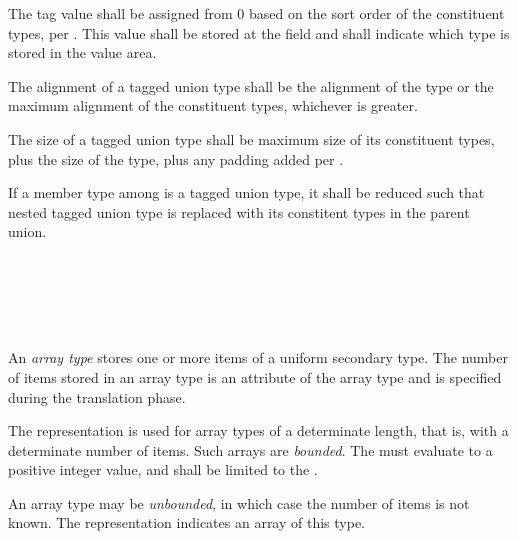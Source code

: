 \specsubsubitem
The tag value shall be assigned from $0$ based on the sort order of the
constituent types, per . This value shall be stored at the
 field and shall indicate which type is stored in the value area.


\specsubsubitem
The alignment of a tagged union type shall be the alignment of the
 type or the maximum alignment of the constituent types, whichever
is greater.

\specsubsubitem
The size of a tagged union type shall be maximum size of its constituent types,
plus the size of the  type, plus any padding added per
.

\specsubsubitem
If a member type among  is a tagged union type, it
shall be reduced such that nested tagged union type is replaced with its
constitent types in the parent union.



\begin{grammar}
 \\
	\terminal{[} \terminal{]}  \\
	\terminal{[}  \terminal{]}  \\
	\terminal{[} \terminal{*} \terminal{]}  \\
\end{grammar}

\specsubsubitem
An \textit{array type} stores one or more items of a uniform secondary type.
The number of items stored in an array type is an attribute of the array type
and is specified during the translation phase.

\specsubsubitem
The  representation is used for array types of a
determinate length, that is, with a determinate number of items. Such arrays are
\textit{bounded}. The  must evaluate to a
positive integer value, and shall be limited to the .

\specsubsubitem
An array type may be \textit{unbounded}, in which case the number of items is
not known. The \terminal{*} representation indicates an array of this type.

